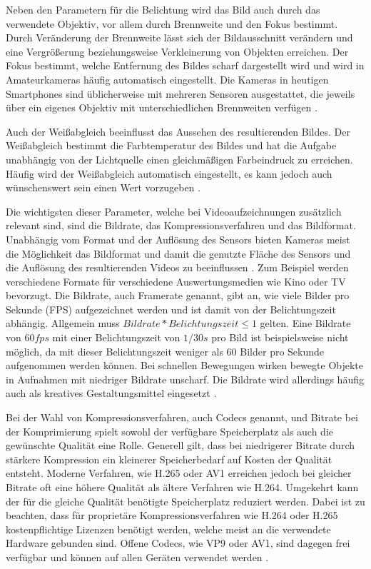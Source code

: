 Neben den Parametern für die Belichtung wird das Bild auch durch das verwendete Objektiv, vor allem durch Brennweite und den Fokus bestimmt.
Durch Veränderung der Brennweite lässt sich der Bildausschnitt verändern und eine Vergrößerung beziehungsweise Verkleinerung von Objekten erreichen.
Der Fokus bestimmt, welche Entfernung des Bildes scharf dargestellt wird und wird in Amateurkameras häufig automatisch eingestellt.
Die Kameras in heutigen Smartphones sind üblicherweise mit mehreren Sensoren ausgestattet, die jeweils über ein eigenes Objektiv mit unterschiedlichen Brennweiten verfügen \cite[S. 499ff.]{Schmidt_Videotechnik}.

Auch der Weißabgleich beeinflusst das Aussehen des resultierenden Bildes.
Der Weißabgleich bestimmt die Farbtemperatur des Bildes und hat die Aufgabe unabhängig von der Lichtquelle einen gleichmäßigen Farbeindruck zu erreichen.
Häufig wird der Weißabgleich automatisch eingestellt, es kann jedoch auch wünschenswert sein einen Wert vorzugeben \cite[S. 434ff.]{Schmidt_Videotechnik}.

Die wichtigsten dieser Parameter, welche bei Videoaufzeichnungen zusätzlich relevant sind, sind die Bildrate, das Kompressionsverfahren und das Bildformat.
Unabhängig vom Format und der Auflösung des Sensors bieten Kameras meist die Möglichkeit das Bildformat und damit die genutzte Fläche des Sensors und die Auflösung des resultierenden Videos zu beeinflussen \cite[S. 422]{Schmidt_Videotechnik}.
Zum Beispiel werden verschiedene Formate für verschiedene Auswertungsmedien wie Kino oder TV bevorzugt.
Die Bildrate, auch Framerate genannt, gibt an, wie viele Bilder pro Sekunde (\ac{FPS}) aufgezeichnet werden und ist damit von der Belichtungszeit abhängig.
Allgemein muss $Bildrate * Belichtungszeit \leq 1$ gelten.
Eine Bildrate von $60 fps$ mit einer Belichtungszeit von $1/30 s$ pro Bild ist beispielsweise nicht möglich, da mit dieser Belichtungszeit weniger als 60 Bilder pro Sekunde aufgenommen werden können.
Bei schnellen Bewegungen wirken bewegte Objekte in Aufnahmen mit niedriger Bildrate unscharf.
Die Bildrate wird allerdings häufig auch als kreatives Gestaltungsmittel eingesetzt \cite[S. 174f.]{Schmidt_Videotechnik}.

Bei der Wahl von Kompressionsverfahren, auch Codecs genannt, und Bitrate bei der Komprimierung spielt sowohl der verfügbare Speicherplatz als auch die gewünschte Qualität eine Rolle.
Generell gilt, dass bei niedrigerer Bitrate durch stärkere Kompression ein kleinerer Speicherbedarf auf Kosten der Qualität entsteht.
Moderne Verfahren, wie H.265 oder AV1 erreichen jedoch bei gleicher Bitrate oft eine höhere Qualität als ältere Verfahren wie H.264.
Umgekehrt kann der für die gleiche Qualität benötigte Speicherplatz reduziert werden.
Dabei ist zu beachten, dass für proprietäre Kompressionsverfahren wie H.264 oder H.265 kostenpflichtige Lizenzen benötigt werden, welche meist an die verwendete Hardware gebunden sind.
Offene Codecs, wie VP9 oder AV1, sind dagegen frei verfügbar und können auf allen Geräten verwendet werden \cite[S. 253ff.]{Schmidt_Videotechnik}.


